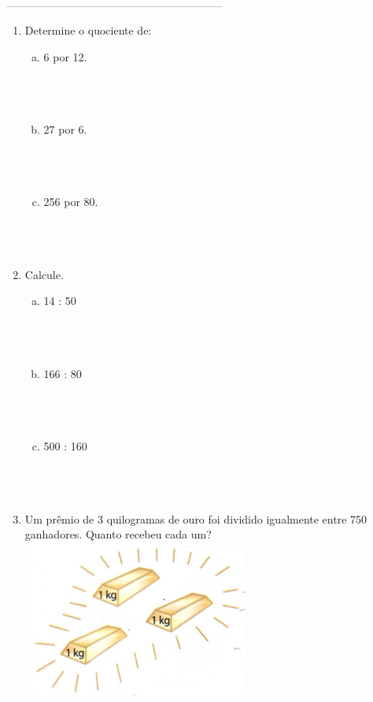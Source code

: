 \documentclass[a4paper,14pt]{article}
\begin{document}
\begin{multicols}{2}
		\noindent\textsubscript{-----------------------------------------------------------------------}
    	\begin{enumerate}
   			\item Determine o quociente de:
   			\begin{enumerate}[a)]
   				\item 6 por 12. \\\\\\\\
   				\item 27 por 6. \\\\\\\\
   				\item 256 por 80. \\\\\\\\
   			\end{enumerate} 
   			\item Calcule.
   			\begin{enumerate}[a)]
   				\item 14 : 50 \\\\\\\\
   				\item 166 : 80 \\\\\\\\
   				\item 500 : 160 \\\\\\\\
   			\end{enumerate} 
   			\item Um prêmio de 3 quilogramas de ouro foi dividido igualmente entre 750 ganhadores. Quanto recebeu cada um? \\
   			\includegraphics[width=0.5\linewidth]{6FMA76_imagens/imagem3} \newpage

\end{enumerate}
\end{multicols}
\end{document}
